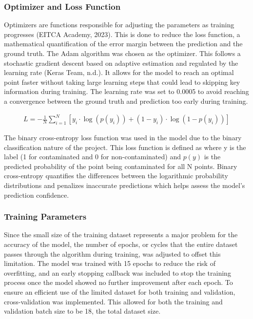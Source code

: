 \documentclass[final, 3p, 11pt]{elsarticle}
\begin{document}
\subsubsection{Optimizer and Loss Function}
Optimizers are functions responsible for adjusting the parameters as training progresses (EITCA Academy, 2023). This is done to reduce the loss function, a mathematical quantification of the error margin between the prediction and the ground truth. The Adam algorithm was chosen as the optimizer. This follows a stochastic gradient descent based on adaptive estimation and regulated by the learning rate (Keras Team, n.d.). It allows for the model to reach an optimal point faster without taking large learning steps that could lead to skipping key information during training. The learning rate was set to 0.0005 to avoid reaching a convergence between the ground truth and prediction too early during training.

\begin{align*}
  L = -\frac{1}{N} \sum_{i=1}^{N} \left[y_i \cdot \log(p(y_i)) + (1 - y_i) \cdot \log(1 - p(y_i)) \right]
  \label{eq:cross_entropy}
\end{align*}

The binary cross-entropy loss function was used in the model due to the binary classification nature of the project. This loss function is defined as where y is the label (1 for contaminated and 0 for non-contaminated) and $p(y)$ is the predicted probability of the point being contaminated for all N points. Binary cross-entropy quantifies the differences between the logarithmic probability distributions and penalizes inaccurate predictions which helps assess the model’s prediction confidence.


\subsubsection{Training Parameters}
Since the small size of the training dataset represents a major problem for the accuracy of the model, the number of epochs, or cycles that the entire dataset passes through the algorithm during training, was adjusted to offset this limitation. The model was trained with 15 epochs to reduce the risk of overfitting, and an early stopping callback was included to stop the training process once the model showed no further improvement after each epoch. To ensure an efficient use of the limited dataset for both training and validation, cross-validation was implemented. This allowed for both the training and validation batch size to be 18, the total dataset size.
\end{document}
